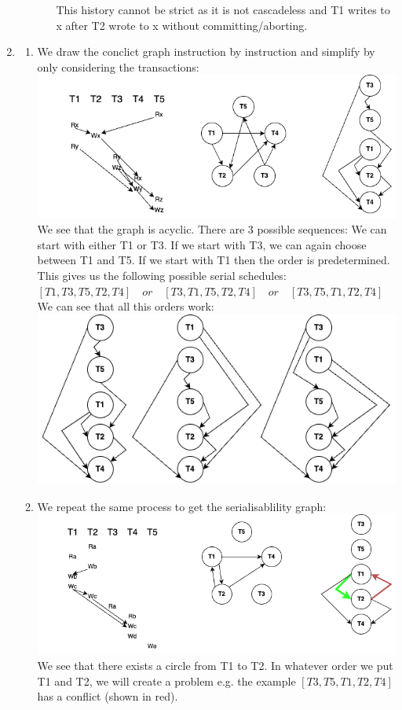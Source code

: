 \documentclass[12pt]{extarticle}
\begin{document}
\begin{flushleft}
\begin{enumerate}[label=\textbf{\Alph*.}]
\begin{enumerate}[label=\arabic*.]
\begin{enumerate}[label=(\alph*)]
This history cannot be strict as it is not cascadeless and T1 writes to x after T2 wrote to x without committing/aborting.
\end{enumerate}
\end{enumerate}
\item \begin{enumerate}[label=(\alph*)]
\item We draw the conclict graph instruction by instruction and simplify by only considering the transactions: \includegraphics[width=\linewidth]{graph_a}
We see that the graph is acyclic. There are 3 possible sequences: We can start with either T1 or T3. If we start with T3, we can again choose between T1 and T5. If we start with T1 then the order is predetermined. This gives us the following possible serial schedules: $[T1, T3, T5, T2, T4 ] \quad or\quad [T3, T1, T5, T2, T4 ] \quad or \quad  [T3,  T5, T1,T2, T4 ] $
We can see that all this orders work:
 \includegraphics[width=\linewidth]{serial_example_a}
\item We repeat the same process to get the serialisablility graph:
 \includegraphics[width=\linewidth]{graph_b}
 We see that there exists a circle from T1 to T2. In whatever order we put T1 and T2, we will create a problem e.g. the example $[T3,  T5, T1,T2, T4 ] $ has a conflict (shown in red).
\end{enumerate}

\end{enumerate}
\end{flushleft}
\end{document}

